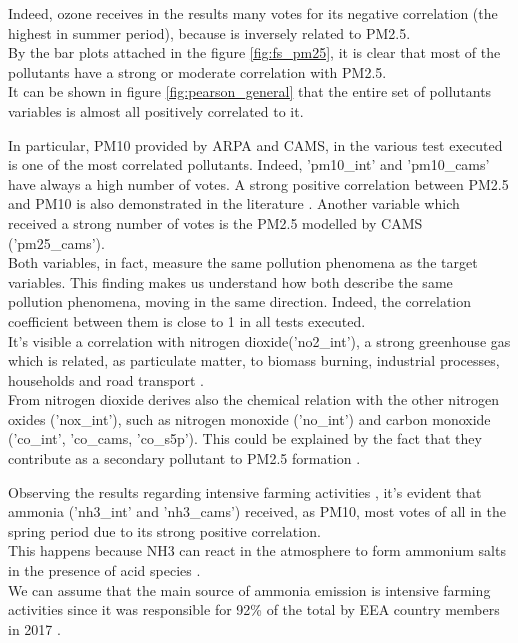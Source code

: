 Indeed, ozone receives in the results many votes for its negative correlation (the highest in summer period), because is inversely related to PM2.5.\\
By the bar plots attached in the figure \ref{fig:fs_pm25}, it is clear that most of the pollutants have a strong or moderate correlation with PM2.5. \\
It can be shown in figure \ref{fig:pearson_general} that the entire set of pollutants variables is almost all positively correlated to it.\par
In particular, PM10 provided by ARPA and CAMS, in the various test executed is one of the most correlated pollutants. Indeed, 'pm10\_int' and 'pm10\_cams' have always a high number of votes. 
A strong positive correlation between PM2.5 and PM10 is also demonstrated in the literature \cite{zhou2016concentrations}.
Another variable which received a strong number of votes is the PM2.5 modelled by CAMS ('pm25\_cams'). \\
Both variables, in fact, measure the same pollution phenomena as the target variables. This finding makes us understand how both describe the same pollution phenomena, moving in the same direction. Indeed, the correlation coefficient between them is close to 1 in all tests executed.\\
It's visible a correlation with nitrogen dioxide('no2\_int'), a strong greenhouse gas which is related, as particulate matter, to biomass burning, industrial processes, households and road transport \cite{zellner2000john} \cite{maranzano2022air}.\\
From nitrogen dioxide derives also the chemical relation with the other nitrogen oxides ('nox\_int'), such as nitrogen monoxide ('no\_int') and carbon monoxide ('co\_int', 'co\_cams, 'co\_s5p'). This could be explained by the fact that they contribute as a secondary pollutant to PM2.5 formation \cite{xie2015spatiotemporal}.
\par
Observing the results regarding intensive farming activities , it's evident that ammonia ('nh3\_int' and 'nh3\_cams') received, as PM10, most votes of all in the spring period due to its strong positive correlation. \\
This happens because NH3 can react in the atmosphere to form ammonium salts in the presence of acid species \cite{viatte2021ammonia}.\\
We can assume that the main source of ammonia emission is intensive farming activities  since it was responsible for 92\% of the total by EEA country members in 2017 \cite{maranzano2022air}.\\
